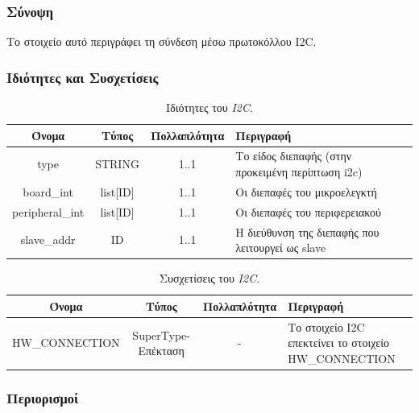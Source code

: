 \subsubsection*{Σύνοψη}

\noindent Το στοιχείο αυτό περιγράφει τη σύνδεση μέσω πρωτοκόλλου I2C.

\subsubsection*{Ιδιότητες και Συσχετίσεις}

\begin{table}[H]
	\begin{center}
		\caption{Ιδιότητες του \textit{I2C}.}
		\label{tab:i2c_con1}
		\begin{tabular}{ | c | c | c| m{5.5cm} | }
			\hline
			\rowcolor{Gray}
			Όνομα & Τύπος & Πολλαπλότητα & Περιγραφή \\
			\hline
			type & STRING & 1..1 & Το είδος διεπαφής (στην προκειμένη περίπτωση i2c) \\
			\hline
			board\_int & list[ID] & 1..1 & Οι διεπαφές του μικροελεγκτή \\
			\hline
			peripheral\_int & list[ID] & 1..1 & Οι διεπαφές του περιφερειακού \\
			\hline
			slave\_addr & ID & 1..1 & Η διεύθυνση της διεπαφής που λειτουργεί ως slave \\
			\hline
		\end{tabular}
	\end{center}
\end{table}

\begin{table}[H]
	\begin{center}
		\caption{Συσχετίσεις του \textit{I2C}.}
		\label{tab:i2c_con2}
		\begin{tabular}{ | c | c | c| m{5.5cm} | }
			\hline
			\rowcolor{Gray}
			Όνομα & Τύπος & Πολλαπλότητα & Περιγραφή \\
			\hline
			\footnotesize{HW\_CONNECTION} & SuperType-Επέκταση & - &  Το στοιχείο I2C επεκτείνει το στοιχείο HW\_CONNECTION \\
			\hline
		\end{tabular}
	\end{center}
\end{table}

\subsubsection*{Περιορισμοί}

